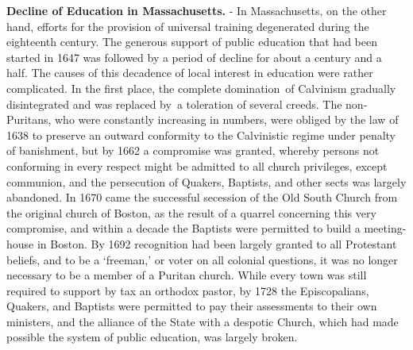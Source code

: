 \documentclass[]{book}
\begin{document}
\textbf{Decline of Education in Massachusetts.} - In Massachusetts, on the other hand, efforts for the provision of universal training degenerated during the eighteenth century. The generous support of public education that had been started in 1647 was followed by a period of decline for about a century and a half. The causes of this decadence of local interest in education were rather complicated. In the first place, the complete domination~of Calvinism gradually disintegrated and was replaced by~a toleration of several creeds. The non-Puritans, who were constantly increasing in numbers, were obliged by the law of 1638 to preserve an outward conformity to the Calvinistic regime under penalty of banishment, but by 1662 a compromise was granted, whereby persons not conforming in every respect might be admitted to all church privileges, except communion, and the persecution of Quakers, Baptists, and other sects was largely abandoned. In 1670 came the successful secession of the Old South Church from the original church of Boston, as the result of a quarrel concerning this very compromise, and within a decade the Baptists were permitted to build a meeting-house in Boston. By 1692 recognition had been largely granted to all Protestant beliefs, and to be a `freeman,' or voter on all colonial questions, it was no longer necessary to be a member of a Puritan church. While every town was still required to support by tax an orthodox pastor, by 1728 the Episcopalians, Quakers, and Baptists were permitted to pay their assessments to their own ministers, and the alliance of the State with a despotic Church, which had made possible the system of public education, was largely broken.
\end{document}
